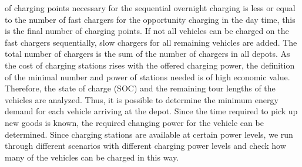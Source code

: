 \documentclass[3p,times,procedia]{elsarticle}
\begin{document}
of charging points necessary for the sequential overnight charging is less or equal to the number of fast chargers for the opportunity charging in the day time, this is the final number of charging points. If not all vehicles can be charged on the fast chargers sequentially, slow chargers for all remaining vehicles are added. The total number of chargers is the sum of the number of chargers in all depots.
As the cost of charging stations rises with the offered charging power, the definition of the minimal number and power of stations needed is of high economic value. Therefore, the state of charge (SOC) and the remaining tour lengths of the vehicles are analyzed. Thus, it is possible to determine the minimum energy demand for each vehicle arriving at the depot. Since the time required to pick up new goods is known, the required changing power for the  vehicle can be determined. Since charging stations are available at certain power levels, we run through different scenarios with different charging power levels and check how many of the vehicles can be charged in this way.
\end{document}
